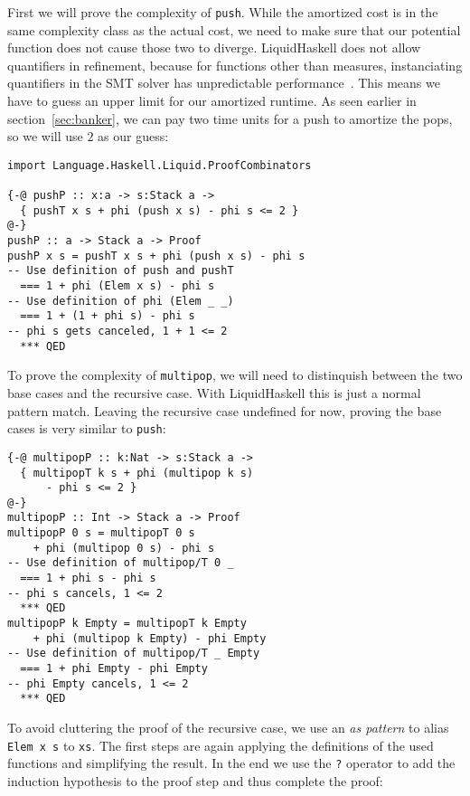 \documentclass[sigplan,screen,review,anonymous]{acmart}
\begin{document}
First we will prove the complexity of \texttt{push}. While the amortized cost is in the same complexity class as the actual cost, we need to make sure that our potential function does not cause those two to diverge. LiquidHaskell does not allow quantifiers in refinement, because for functions other than measures, instanciating quantifiers in the SMT solver has unpredictable performance~\cite{lh_quantifiers}. This means we have to guess an upper limit for our amortized runtime. As seen earlier in section~\ref{sec:banker}, we can pay two time units for a push to amortize the pops, so we will use $2$ as our guess:

\begin{lstlisting}
import Language.Haskell.Liquid.ProofCombinators

{-@ pushP :: x:a -> s:Stack a ->
  { pushT x s + phi (push x s) - phi s <= 2 }
@-}
pushP :: a -> Stack a -> Proof
pushP x s = pushT x s + phi (push x s) - phi s
-- Use definition of push and pushT
  === 1 + phi (Elem x s) - phi s
-- Use definition of phi (Elem _ _)
  === 1 + (1 + phi s) - phi s
-- phi s gets canceled, 1 + 1 <= 2
  *** QED
\end{lstlisting}

To prove the complexity of \texttt{multipop}, we will need to distinquish between the two base cases and the recursive case. With LiquidHaskell this is just a normal pattern match. Leaving the recursive case undefined for now, proving the base cases is very similar to \texttt{push}:

\begin{lstlisting}
{-@ multipopP :: k:Nat -> s:Stack a ->
  { multipopT k s + phi (multipop k s)
      - phi s <= 2 }
@-}
multipopP :: Int -> Stack a -> Proof
multipopP 0 s = multipopT 0 s
    + phi (multipop 0 s) - phi s
-- Use definition of multipop/T 0 _
  === 1 + phi s - phi s
-- phi s cancels, 1 <= 2
  *** QED
multipopP k Empty = multipopT k Empty
    + phi (multipop k Empty) - phi Empty
-- Use definition of multipop/T _ Empty
  === 1 + phi Empty - phi Empty
-- phi Empty cancels, 1 <= 2
  *** QED
\end{lstlisting}

To avoid cluttering the proof of the recursive case, we use an \textit{as pattern} to alias \texttt{Elem x s} to \texttt{xs}. The first steps are again applying the definitions of the used functions and simplifying the result. In the end we use the \texttt{?} operator to add the induction hypothesis to the proof step and thus complete the proof:
\end{document}
